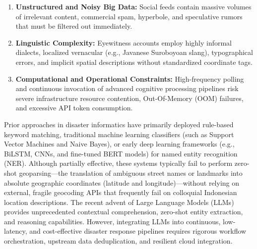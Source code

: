 \documentclass[conference]{IEEEtran}
\begin{document}
\begin{enumerate}
    \item \textbf{Unstructured and Noisy Big Data:} Social feeds contain massive volumes of irrelevant content, commercial spam, hyperbole, and speculative rumors that must be filtered out immediately.
    \item \textbf{Linguistic Complexity:} Eyewitness accounts employ highly informal dialects, localized vernacular (e.g., Javanese Suroboyoan slang), typographical errors, and implicit spatial descriptions without standardized coordinate tags.
    \item \textbf{Computational and Operational Constraints:} High-frequency polling and continuous invocation of advanced cognitive processing pipelines risk severe infrastructure resource contention, Out-Of-Memory (OOM) failures, and excessive API token consumption.
\end{enumerate}

Prior approaches in disaster informatics have primarily deployed rule-based keyword matching, traditional machine learning classifiers (such as Support Vector Machines and Naive Bayes), or early deep learning frameworks (e.g., BiLSTM, CNNs, and fine-tuned BERT models) for named entity recognition (NER). Although partially effective, these systems typically fail to perform zero-shot geoparsing—the translation of ambiguous street names or landmarks into absolute geographic coordinates (latitude and longitude)—without relying on external, fragile geocoding APIs that frequently fail on colloquial Indonesian location descriptions. The recent advent of Large Language Models (LLMs) provides unprecedented contextual comprehension, zero-shot entity extraction, and reasoning capabilities. However, integrating LLMs into continuous, low-latency, and cost-effective disaster response pipelines requires rigorous workflow orchestration, upstream data deduplication, and resilient cloud integration.
\end{document}
